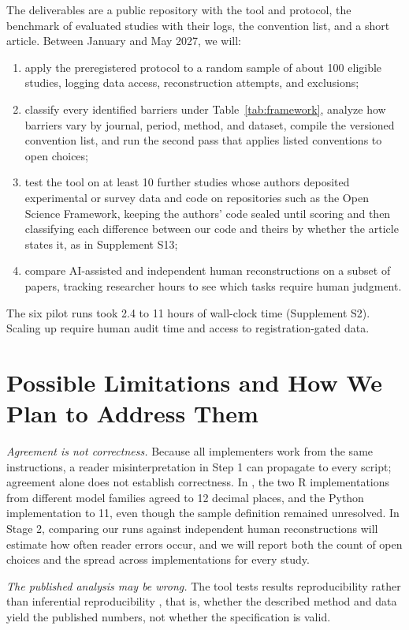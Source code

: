 \documentclass[12pt]{article}
\begin{document}
The deliverables are a public repository with the tool and protocol, the benchmark of evaluated studies with their logs, the convention list, and a short article. Between January and May 2027, we will:
\begin{enumerate}
\item apply the preregistered protocol to a random sample of about 100 eligible studies, logging data access, reconstruction attempts, and exclusions;
\item classify every identified barriers under Table~\ref{tab:framework}, analyze how barriers vary by journal, period, method, and dataset, compile the versioned convention list, and run the second pass that applies listed conventions to open choices;
\item test the tool on at least 10 further studies whose authors deposited experimental or survey data and code on repositories such as the Open Science Framework, keeping the authors' code sealed until scoring and then classifying each difference between our code and theirs by whether the article states it, as in Supplement S13;
\item compare AI-assisted and independent human reconstructions on a subset of papers, tracking researcher hours to see which tasks require human judgment.
\end{enumerate}
The six pilot runs took 2.4 to 11 hours of wall-clock time (Supplement S2). Scaling up require human audit time and access to registration-gated data.

\section{Possible Limitations and How We Plan to Address Them}\label{sec:limits}

\textit{Agreement is not correctness.} Because all implementers work from the same instructions, a reader misinterpretation in Step 1 can propagate to every script; agreement alone does not establish correctness.
In \citet{delaney1996}, the two R implementations from different model families agreed to 12 decimal places, and the Python implementation to 11, even though the sample definition remained unresolved. In Stage 2, comparing our runs against independent human reconstructions will estimate how often reader errors occur, and we will report both the count of open choices and the spread across implementations for every study.

\textit{The published analysis may be wrong.} The tool tests results reproducibility rather than inferential reproducibility \citep{aguinis2018}, that is, whether the described method and data yield the published numbers, not whether the specification is valid.
\end{document}
